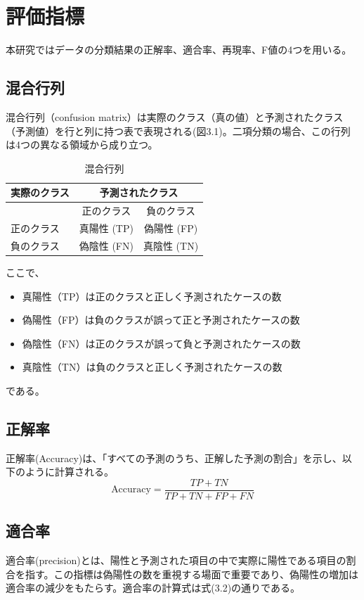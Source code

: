 \documentclass[platex]{suribt}
\begin{document}
\section{評価指標}
本研究ではデータの分類結果の正解率、適合率、再現率、F値の4つを用いる。
\subsection{混合行列}
混合行列（confusion matrix）は実際のクラス（真の値）と予測されたクラス（予測値）を行と列に持つ表で表現される(図3.1)。二項分類の場合、この行列は4つの異なる領域から成り立つ。
\begin{table}[h]
  \centering
  \begin{tabular}{|l|c|c|}
  \hline
  \multicolumn{1}{|c|}{\textbf{実際のクラス}} & \multicolumn{2}{c|}{\textbf{予測されたクラス}} \\ \hline
   & 正のクラス & 負のクラス \\ \hline
  正のクラス & 真陽性 (TP) & 偽陽性 (FP) \\ \hline
  負のクラス & 偽陰性 (FN) & 真陰性 (TN) \\ \hline
  \end{tabular}
  \caption{混合行列}
\end{table}

ここで、
\begin{itemize}
  \item  真陽性（TP）は正のクラスと正しく予測されたケースの数
  \item  偽陽性（FP）は負のクラスが誤って正と予測されたケースの数
  \item  偽陰性（FN）は正のクラスが誤って負と予測されたケースの数
  \item  真陰性（TN）は負のクラスと正しく予測されたケースの数
\end{itemize}
である。


\subsection{正解率}
正解率(Accuracy)は、「すべての予測のうち、正解した予測の割合」を示し、以下のように計算される。
\begin{equation}
  \text{Accuracy} = \frac{TP + TN}{TP + TN + FP + FN}
\end{equation}

\subsection{適合率}
適合率(precision)とは、陽性と予測された項目の中で実際に陽性である項目の割合を指す。この指標は偽陽性の数を重視する場面で重要であり、偽陽性の増加は適合率の減少をもたらす。適合率の計算式は式(3.2)の通りである。
\end{document}
